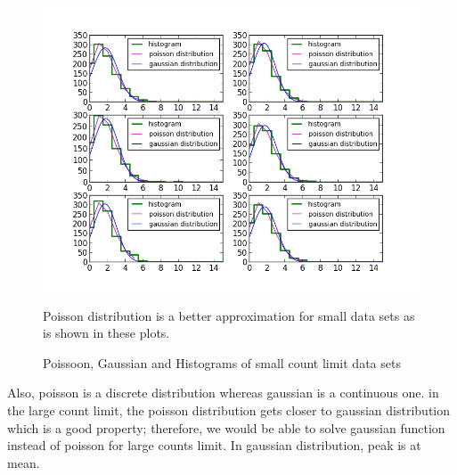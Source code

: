 \documentclass[letterpaper,12pt]{article}
\begin{document}
\begin{figure}
\centering
\includegraphics[scale=0.9]{poisson-gaussian-histograms-8.png}
\caption{Poissoon, Gaussian and Histograms of small count limit data sets}
Poisson distribution is a better approximation for small data sets as is shown in these plots.
\end{figure}

 Also, poisson is a discrete distribution whereas gaussian is a continuous one. in the large count limit, the poisson distribution gets closer to gaussian distribution which is a good property; therefore, we would be able to solve gaussian function instead of poisson for large counts limit. In gaussian distribution, peak is at mean.
 
\end{document}
